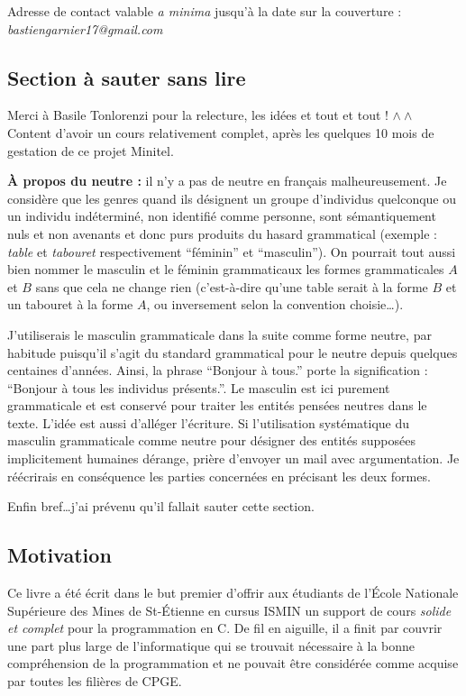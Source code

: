 \documentclass[../main.tex]{subfiles}
\begin{document}
Adresse de contact valable \textit{a minima} jusqu'à la date sur la couverture : \textit{bastiengarnier17@gmail.com}
\subsection*{Section à sauter sans lire}
Merci à Basile Tonlorenzi pour la relecture, les idées et tout et tout ! $\wedge\wedge$ Content d'avoir un cours relativement complet, après les quelques 10 mois de gestation de ce projet Minitel.

\textbf{À propos du neutre :} il n'y a pas de neutre en français malheureusement. Je considère que les genres quand ils désignent un groupe d'individus quelconque ou un individu indéterminé, non identifié comme personne, sont sémantiquement nuls et non avenants et donc purs produits du hasard grammatical (exemple : \textit{table} et \textit{tabouret} respectivement ``féminin'' et ``masculin''). On pourrait tout aussi bien nommer le masculin et le féminin grammaticaux les formes grammaticales $A$ et $B$ sans que cela ne change rien (c'est-à-dire qu'une table serait à la forme $B$ et un tabouret à la forme $A$, ou inversement selon la convention choisie\dots).

J'utiliserais le masculin grammaticale dans la suite comme forme neutre, par habitude puisqu'il s'agit du standard grammatical pour le neutre depuis quelques centaines d'années. Ainsi, la phrase ``Bonjour à tous.'' porte la signification : ``Bonjour à tous les individus présents.''. Le masculin est ici purement grammaticale et est conservé pour traiter les entités pensées neutres dans le texte. L'idée est aussi d'alléger l'écriture. Si l'utilisation systématique du masculin grammaticale comme neutre pour désigner des entités supposées implicitement humaines dérange, prière d'envoyer un mail avec argumentation. Je réécrirais en conséquence les parties concernées en précisant les deux formes.

Enfin bref\dots j'ai prévenu qu'il fallait sauter cette section.
\subsection*{Motivation}
Ce livre a été écrit dans le but premier d'offrir aux étudiants de l'École Nationale Supérieure des
Mines de St-Étienne en cursus ISMIN un support de cours \textit{solide et complet} pour la programmation en C. De fil
en aiguille, il a finit par couvrir une part plus large de l'informatique qui se trouvait nécessaire à la
bonne compréhension de la programmation et ne pouvait être considérée comme acquise par toutes les
filières de CPGE.
\end{document}
